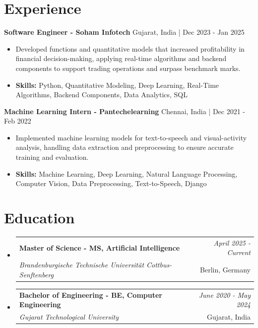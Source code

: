 \documentclass[a4paper,11pt]{article}
\makeatletter
\newcommand{\resumeSubheading}[4]{
\vspace{0.5mm}\item
    \begin{tabular*}{0.98\textwidth}[t]{l@{\extracolsep{\fill}}r}
        \textbf{#1} & \textit{\footnotesize{#4}} \\
        \textit{\footnotesize{#3}} &  \footnotesize{#2}\\
    \end{tabular*}
    \vspace{-2.4mm}
}
\makeatother
\begin{document}
\section{\textbf{Experience}}


\vspace{1mm}
  \textbf{Software Engineer - Soham Infotech} \hfill Gujarat, India | Dec 2023 - Jan 2025
\vspace{-1.5mm} %
\begin{itemize}
  \item Developed functions and quantitative models that increased profitability in financial decision-making, applying real-time algorithms and backend components to support trading operations and surpass benchmark marks.

\vspace{-2mm}
  \item \textbf{Skills:} Python, Quantitative Modeling, Deep Learning, Real-Time Algorithms, Backend Components, Data Analytics, SQL
\end{itemize}

\vspace{1mm}
  \textbf{Machine Learning Intern - Pantechelearning} \hfill Chennai, India | Dec 2021 - Feb 2022
\vspace{-1.5mm} %
\begin{itemize}
  \item Implemented machine learning models for text-to-speech and visual-activity analysis, handling data extraction and preprocessing to ensure accurate training and evaluation.
\vspace{-2mm}
  \item \textbf{Skills:} Machine Learning, Deep Learning, Natural Language Processing, Computer Vision, Data Preprocessing, Text-to-Speech, Django
\end{itemize}\section{\textbf{Education}}
\vspace{-0.4mm}

\begin{itemize}
\resumeSubheading
{Master of Science - MS, Artificial Intelligence }{Berlin, Germany}
{Brandenburgische Technische Universität Cottbus-Senftenberg  }{April 2025 - Current}

\vspace{1.0mm} %
\resumeSubheading
{Bachelor of Engineering - BE, Computer Engineering  }{Gujarat, India}
{Gujarat Technological University }{June 2020 - May 2024}

\end{itemize}
\end{document}
